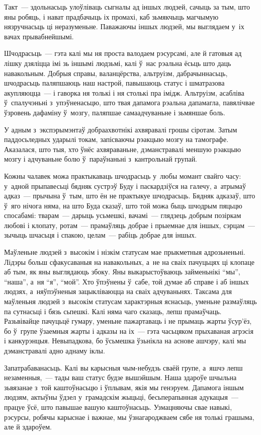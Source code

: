 Такт~--- здольнасьць улоўліваць сыгналы ад іншых людзей, сачыць за тым, што яны робяць, і нават прадбачыць іх промахі, каб зьмякчыць магчымую нязручнасьць ці неразуменьне. Паважаючы іншых людзей, мы выглядаем у~іх вачах прывабнейшымі.

Шчодрасьць~--- гэта калі мы ня проста валодаем рэсурсамі, але й гатовыя ад лішку дзяліцца імі зь іншымі людзьмі, калі ў~нас рэальна ёсьць што даць навакольным. Добрыя справы, валанцёрства, альтруізм, дабрачыннасьць, шчодрасьць паляпшаюць наш настрой, павышаюць статус і шматразова акупляюцца~--- і гаворка ня толькі і ня столькі пра імідж. Альтруізм, асабліва ў~спалучэньні з~упэўненасьцю, што твая дапамога рэальна дапамагла, павялічвае ўзровень дафаміну ў~мозгу, паляпшае самаадчуваньне і зьмяншае боль.

У адным з~экспэрымэнтаў добраахвотнікі ахвяравалі грошы сіротам. Затым паддосьледных ударылі токам, запісваючы рэакцыю мозгу на тамографе. Аказалася, што тыя, хто ўнёс ахвяраваньне, дэманстравалі меншую рэакцыю мозгу і адчуваньне болю ў~параўнаньні з~кантрольнай групай.

Кожны чалавек можа практыкаваць шчодрасьць у~любы момант свайго часу: у~адной прыпавесьці бядняк сустрэў Буду і паскардзіўся на галечу, а~атрымаў адказ~--- прычына ў~тым, што ён не практыкуе шчодрасьць. Бядняк адказаў, што ў~яго нічога няма, на што Буда сказаў, што той можа быць шчодрым пяцьцю спосабамі: тварам~--- дарыць усьмешкі, вачамі~--- глядзець добрым позіркам любові і клопату, ротам~--- прамаўляць добрае і прыемнае для іншых, сэрцам~--- зычыць шчасьця і спакою, целам~--- рабіць добрае для іншых.

Маўленьне людзей з~высокім і нізкім статусам мае прыкметныя адрозьненьні. Лідэры больш сфакусаваныя на навакольных, а~не на сваіх пачуцьцях ці клопаце аб тым, як яны выглядаюць збоку. Яны выкарыстоўваюць займеньнікі ``мы'', ``наша'', а~ня ``я'', ``мой''. Хто ўпэўнены ў~сабе, той думае аб справе і аб іншых людзях, а~няўпэўненыя зацыкліваюцца на сваіх адчуваньнях. Таксама для маўленьня людзей з~высокім статусам характэрныя яснасьць, уменьне размаўляць па сутнасьці і бязь сьпешкі. Калі няма чаго сказаць, лепш прамаўчаць. Разьвівайце пачуцьцё гумару, уменьне пажартаваць і не прымаць жарты ўсур'ёз, бо ў~групе ўзаемныя жарты і адказы на іх~--- гэта часьцяком прыхаваная агрэсія і канкурэнцыя. Невыпадкова, бо ўсьмешка ўзьнікла на аснове ашчэру, калі мы дэманстравалі адно аднаму іклы.

Запатрабаванасьць. Калі вы карысныя чым-небудзь сваёй групе, а~яшчэ лепш незаменныя,~--- тады ваш статус будзе вышэйшым. Наша здароўе шчыльна зьвязанае з~той каштоўнасьцю і ўплывам, якія мы генэруем. Дапамога іншым людзям, актыўны ўдзел у~грамадскім жыцьці, бесьперапынная адукацыя~--- працуе ўсё, што павышае вашую каштоўнасьць. Узмацняючы свае навыкі, рэсурсы, робячы карыснае і важнае, мы ўзнагароджваем сябе ня толькі грашыма, але й здароўем.

